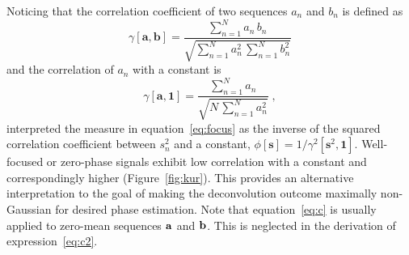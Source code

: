 Noticing that the correlation
coefficient of two sequences $a_n$ and $b_n$ is defined as
\begin{equation}
  \gamma[\mathbf{a},\mathbf{b}] = {\frac{\displaystyle \sum_{n=1}^N a_n\,b_n}{\displaystyle \sqrt{\sum_{n=1}^N a_n^2\,\sum_{n=1}^N b_n^2}}}
  \label{eq:c}
\end{equation}
and the correlation of $a_n$ with a constant is
\begin{equation}
  \gamma[\mathbf{a},\mathbf{1}] = {\frac{\displaystyle \sum_{n=1}^N a_n}{\displaystyle \sqrt{N\,\sum_{n=1}^N a_n^2}}}\;,
  \label{eq:c2}
\end{equation}
\cite{diffr} interpreted the   measure in
equation~\ref{eq:focus} as the inverse of the squared correlation
coefficient between $s_n^2$ and a constant, $\phi[\mathbf{s}] =
1/\gamma^2[\mathbf{s}^2,\mathbf{1}]$. Well-focused or zero-phase
signals exhibit low correlation with a constant and correspondingly
higher   (Figure~\ref{fig:kur}). This provides an alternative
interpretation to the goal of making the deconvolution outcome
maximally non-Gaussian for desired phase estimation. Note that
equation~\ref{eq:c} is usually applied to zero-mean sequences ${\bf
a}$ and ${\bf b}$. This is neglected in the derivation of
expression~\ref{eq:c2}.




